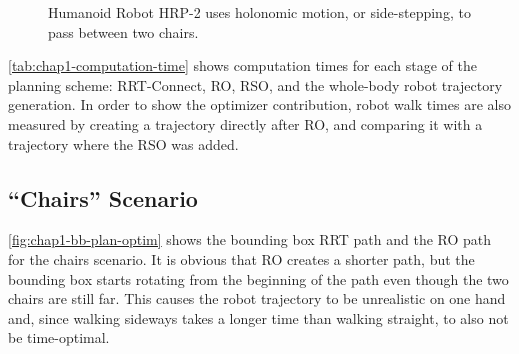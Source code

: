 \begin{figure}
  \caption{Humanoid Robot HRP-2 uses holonomic motion, or
    side-stepping, to pass between two chairs.}
  \label{fig:chap1-hrp2-chairs}
\end{figure}

\autoref{tab:chap1-computation-time} shows computation times for each stage
of the planning scheme: RRT-Connect, RO, RSO, and the whole-body robot
trajectory generation. In order to show the optimizer contribution,
robot walk times are also measured by creating a trajectory directly
after RO, and comparing it with a trajectory where the RSO was added.

\subsection{``Chairs'' Scenario}
\label{subsec:chap1-chairs}

\autoref{fig:chap1-bb-plan-optim} shows the bounding box RRT path
and the RO path for the chairs scenario. It is obvious that RO creates
a shorter path, but the bounding box starts rotating from the
beginning of the path even though the two chairs are still far. This
causes the robot trajectory to be unrealistic on one hand and, since
walking sideways takes a longer time than walking straight, to also
not be time-optimal.


